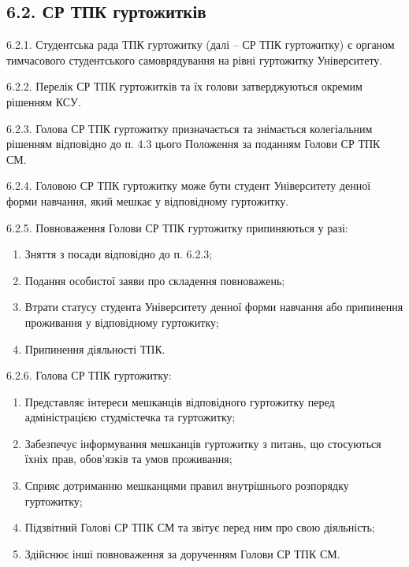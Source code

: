 \subsection*{6.2. СР ТПК гуртожитків}
    6.2.1. Студентська рада ТПК гуртожитку (далі -- СР ТПК гуртожитку) є органом тимчасового студентського самоврядування на рівні гуртожитку Університету.

    6.2.2. Перелік СР ТПК гуртожитків та їх голови затверджуються окремим рішенням КСУ.

    6.2.3. Голова СР ТПК гуртожитку призначається та знімається колегіальним рішенням відповідно до п. 4.3 цього Положення за поданням Голови СР ТПК СМ.

    6.2.4. Головою СР ТПК гуртожитку може бути студент Університету денної форми навчання, який мешкає у відповідному гуртожитку.

    6.2.5. Повноваження Голови СР ТПК гуртожитку припиняються у разі:

        \begin{enumerate}[label=\alph*)]
            \item Зняття з посади відповідно до п. 6.2.3;
            \item Подання особистої заяви про складення повноважень;
            \item Втрати статусу студента Університету денної форми навчання або припинення проживання у відповідному гуртожитку;
            \item Припинення діяльності ТПК.
        \end{enumerate}

    6.2.6. Голова СР ТПК гуртожитку:

        \begin{enumerate}[label=\alph*)]
            \item Представляє інтереси мешканців відповідного гуртожитку перед адміністрацією студмістечка та гуртожитку;
            \item Забезпечує інформування мешканців гуртожитку з питань, що стосуються їхніх прав, обов'язків та умов проживання;
            \item Сприяє дотриманню мешканцями правил внутрішнього розпорядку гуртожитку;
            \item Підзвітний Голові СР ТПК СМ та звітує перед ним про свою діяльність;
            \item Здійснює інші повноваження за дорученням Голови СР ТПК СМ.
        \end{enumerate}
